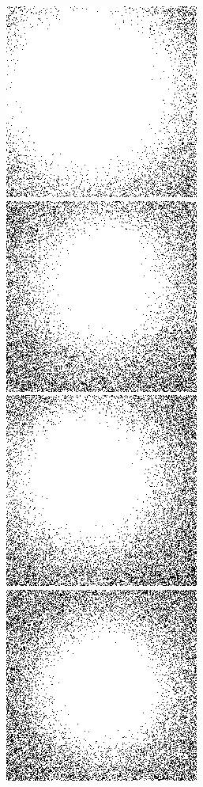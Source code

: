\documentclass[a4paper,fleqn,usenatbib]{mnras}
\begin{document}
\begin{figure}

  \includegraphics[scale=0.4]{ps1.png}
  \includegraphics[scale=0.4]{ps2.png}
  \includegraphics[scale=0.4]{ps3.png}  
  \includegraphics[scale=0.4]{ps4.png}

\end{figure}
\end{document}
